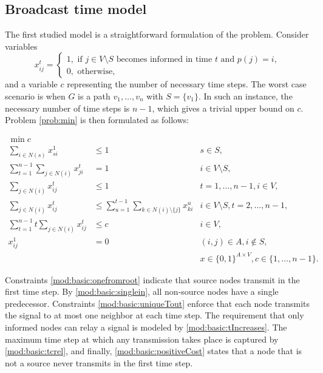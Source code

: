 \subsection{Broadcast time model}
The first studied model is a straightforward formulation of the problem. Consider variables $$ x_{ij}^t=\begin{cases} 1, \text{ if } j\in V\setminus S \text{ becomes informed in time } t \text{ and } p(j)=i,\\ 0, \text{ otherwise},
\end{cases}
$$
and a variable $c$ representing the number of necessary time steps.
The worst case scenario is when $G$ is a path $v_1,\dots,v_n$ with $S=\{v_1\}$. 
In such an instance, the necessary number of time steps is $n-1$, which gives a trivial upper bound on $c$.
Problem \ref{prob:min} is then formulated as follows: 

\begin{subequations}\label{mod:basic}
\begin{align}
\label{mod:basic:obj} \min c \\ 
\label{mod:basic:onefromroot} \sum_{i \in N(s)}x^1_{si} & \leq 1 & s\in S,\\
\label{mod:basic:singlein} \sum\limits_{t=1}^{n-1}\sum\limits_{j\in N(i)}x_{ji}^t & = 1 & i\in V \setminus S,\\
\label{mod:basic:uniqueTout} \sum\limits_{j\in N(i)}x_{ij}^t & \leq 1  & t=1,\dots,n-1,i\in V,\\
\label{mod:basic:tIncreases} \sum\limits_{j\in N(i)}x_{ij}^t &\leq\sum\limits_{u=1}^{t-1}\sum\limits_{k\in N(i)\setminus\{j\}} x_{ki}^u  & i\in V\setminus S, t=2,\dots,n-1,\\
\label{mod:basic:tcrel} \sum\limits_{t=1}^{n-1}t\sum\limits_{j\in N(i)}x_{ij}^t & \leq c &  i\in V,\\
\label{mod:basic:positiveCost}x_{ij}^1 & = 0 & (i,j)\in A, i \not\in S,\\
\label{mod:basic:dim}&&x \in \{0,1\}^{A\times V}, c \in\{1,\dots,n-1\}.
\end{align}~
\end{subequations}

Constraints \eqref{mod:basic:onefromroot} indicate that source nodes transmit in the first time step.
By \eqref{mod:basic:singlein}, all non-source nodes have a single predecessor.
Constraints \eqref{mod:basic:uniqueTout} enforce that each node transmits the signal to at most one neighbor at each time step.
The requirement that only informed nodes can relay a signal is modeled by \eqref{mod:basic:tIncreases}. 
The maximum time step at which any transmission takes place is captured by \eqref{mod:basic:tcrel}, and finally, \eqref{mod:basic:positiveCost} states that a node that is not a source never transmits in the first time step.

